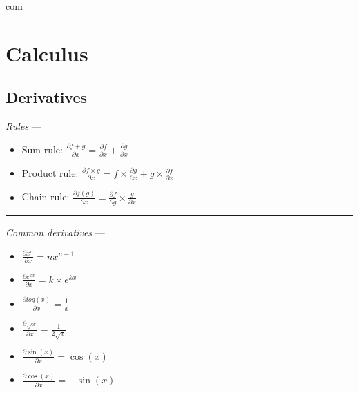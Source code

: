com\section{Calculus}
\subsection*{Derivatives}
\emph{Rules} --- 
\begin{multicols}{2}
\begin{itemize}
    \item Sum rule: $\frac{\partial f + g}{\partial x} = \frac{\partial f}{\partial x} + \frac{\partial g}{\partial x}$
    \item Product rule: $\frac{\partial f \times g}{\partial x} = f \times \frac{\partial g}{\partial x} + g \times \frac{\partial f}{\partial x}$
    \item Chain rule: $\frac{\partial f(g)}{\partial x} = \frac{\partial f}{\partial g} \times \frac{g}{\partial x}$
\end{itemize}
\end{multicols}

{\color{lightgray}\hrule height 0.001mm}

\emph{Common derivatives} --- 
\begin{multicols}{2}
\begin{itemize}
    \item $\frac{\partial x^n}{\partial x} = nx^{n-1}$
    \item $\frac{\partial e^{kx}}{\partial x} = k \times e^{kx}$
    \item $\frac{\partial log(x)}{\partial x} = \frac{1}{x}$
    \item $\frac{\partial \sqrt{x}}{\partial x} = \frac{1}{2\sqrt{x}}$
    \item $\frac{\partial \sin(x)}{\partial x} = \cos(x)$
    \item $\frac{\partial \cos(x)}{\partial x} = -\sin(x)$
\end{itemize}
\end{multicols}